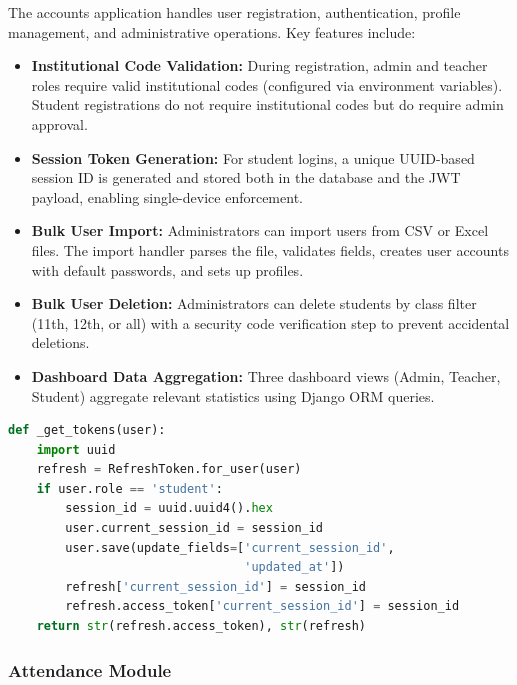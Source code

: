 The accounts application handles user registration, authentication, profile management, and administrative operations. Key features include:

\begin{itemize}[leftmargin=2em]
    \item \textbf{Institutional Code Validation:} During registration, admin and teacher roles require valid institutional codes (configured via environment variables). Student registrations do not require institutional codes but do require admin approval.
    
    \item \textbf{Session Token Generation:} For student logins, a unique UUID-based session ID is generated and stored both in the database and the JWT payload, enabling single-device enforcement.
    
    \item \textbf{Bulk User Import:} Administrators can import users from CSV or Excel files. The import handler parses the file, validates fields, creates user accounts with default passwords, and sets up profiles.
    
    \item \textbf{Bulk User Deletion:} Administrators can delete students by class filter (11th, 12th, or all) with a security code verification step to prevent accidental deletions.
    
    \item \textbf{Dashboard Data Aggregation:} Three dashboard views (Admin, Teacher, Student) aggregate relevant statistics using Django ORM queries.
\end{itemize}

\begin{lstlisting}[language=Python, caption={Token Generation with Session Control}]
def _get_tokens(user):
    import uuid
    refresh = RefreshToken.for_user(user)
    if user.role == 'student':
        session_id = uuid.uuid4().hex
        user.current_session_id = session_id
        user.save(update_fields=['current_session_id', 
                                 'updated_at'])
        refresh['current_session_id'] = session_id
        refresh.access_token['current_session_id'] = session_id
    return str(refresh.access_token), str(refresh)
\end{lstlisting}

\subsubsection{Attendance Module}

